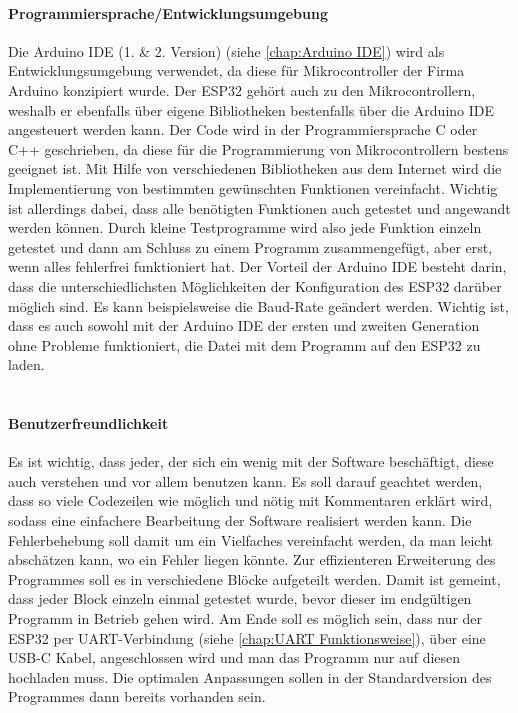 \documentclass[titlepage,12pt,twoside]{article}
\begin{document}
\paragraph{Programmiersprache/Entwicklungsumgebung}
\hfill \break
\hfill \break
Die Arduino IDE (1. \& 2. Version) (siehe \autoref{chap:Arduino IDE}) wird als Entwicklungsumgebung verwendet, da diese für Mikrocontroller der Firma Arduino 
konzipiert wurde. Der ESP32 gehört auch zu den Mikrocontrollern, weshalb er ebenfalls über eigene Bibliotheken bestenfalls 
über die Arduino IDE angesteuert werden kann. Der Code wird in der Programmiersprache C oder C++ geschrieben, da diese für 
die Programmierung von Mikrocontrollern bestens geeignet ist. Mit Hilfe von verschiedenen Bibliotheken aus dem Internet wird 
die Implementierung von bestimmten gewünschten Funktionen vereinfacht. Wichtig ist allerdings dabei, dass alle benötigten 
Funktionen auch getestet und angewandt werden können. Durch kleine Testprogramme wird also jede Funktion einzeln getestet und 
dann am Schluss zu einem Programm zusammengefügt, aber erst, wenn alles fehlerfrei funktioniert hat. Der Vorteil der Arduino 
IDE besteht darin, dass die unterschiedlichsten Möglichkeiten der Konfiguration des ESP32 darüber möglich sind. Es kann 
beispielsweise die Baud-Rate geändert werden. Wichtig ist, dass es auch sowohl mit der Arduino IDE der ersten und zweiten 
Generation ohne Probleme funktioniert, die Datei mit dem Programm auf den ESP32 zu laden. \\
\\
\paragraph{Benutzerfreundlichkeit}
\hfill \break
\hfill \break
Es ist wichtig, dass jeder, der sich ein wenig mit der Software beschäftigt, diese auch verstehen und vor allem benutzen kann. 
Es soll darauf geachtet werden, dass so viele Codezeilen wie möglich und nötig mit Kommentaren erklärt wird, sodass eine 
einfachere Bearbeitung der Software realisiert werden kann. Die Fehlerbehebung soll damit um ein Vielfaches vereinfacht werden, 
da man leicht abschätzen kann, wo ein Fehler liegen könnte. Zur effizienteren Erweiterung des Programmes soll es in 
verschiedene Blöcke aufgeteilt werden. Damit ist gemeint, dass jeder Block einzeln einmal getestet wurde, bevor dieser im 
endgültigen Programm in Betrieb gehen wird. Am Ende soll es möglich sein, dass nur der ESP32 per UART-Verbindung (siehe \autoref{chap:UART Funktionsweise}), über eine 
USB-C Kabel, angeschlossen wird und man das Programm nur auf diesen hochladen muss. Die optimalen Anpassungen sollen in der 
Standardversion des Programmes dann bereits vorhanden sein. \\
\\
\end{document}
